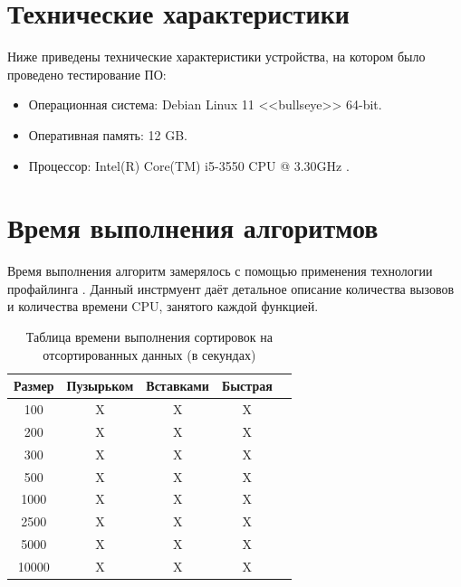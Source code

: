 \documentclass[12pt]{report}
\begin{document}
\section{Технические характеристики}

Ниже приведены технические характеристики устройства, на котором было проведено тестирование ПО:

\begin{itemize}
	\item Операционная система: Debian \cite{debian} Linux \cite{linux} 11 <<bullseye>> 64-bit.
	\item Оперативная память: 12 GB.
	\item Процессор: Intel(R) Core(TM) i5-3550 CPU @ 3.30GHz
\cite{i5}.

\end{itemize}

\section{Время выполнения алгоритмов}
Время выполнения алгоритм замерялось с помощью применения технологии профайлинга \cite{profiling}. Данный инстрмуент даёт детальное описание количества вызовов и количества времени CPU, занятого каждой функцией. \newline

\begin{table} [h!]
	\caption{Таблица времени выполнения сортировок на отсортированных данных (в секундах)}
	\begin{center}
		\begin{tabular}{|c c c c c|} 
			\hline
			Размер & Пузырьком & Вставками & Быстрая &\\  
			\hline
			100 & X & X & X &\\
			\hline
			200 & X & X & X &\\
			\hline
			300 & X & X & X &\\
			\hline
			500 & X & X & X &\\
			\hline
			1000 & X & X & X &\\
			\hline
			2500 & X & X & X &\\
			\hline
			5000 & X & X & X &\\
			\hline
			10000 & X & X & X &\\
			\hline
		\end{tabular}
	\end{center}
\end{table}
\end{document}
